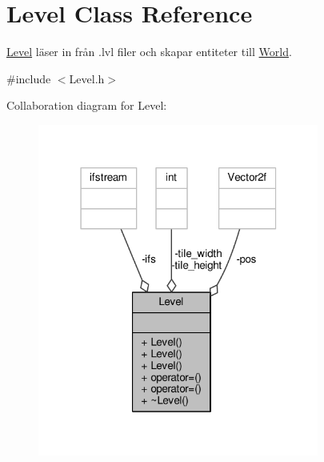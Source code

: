 \hypertarget{classLevel}{\section{Level Class Reference}
\label{classLevel}
}


\hyperlink{classLevel}{Level} läser in från .lvl filer och skapar entiteter till \hyperlink{classWorld}{World}.  




{\ttfamily \#include $<$Level.\+h$>$}



Collaboration diagram for Level\+:\nopagebreak
\begin{figure}[H]
\begin{center}
\leavevmode
\includegraphics[width=262pt]{classLevel__coll__graph}
\end{center}
\end{figure}
